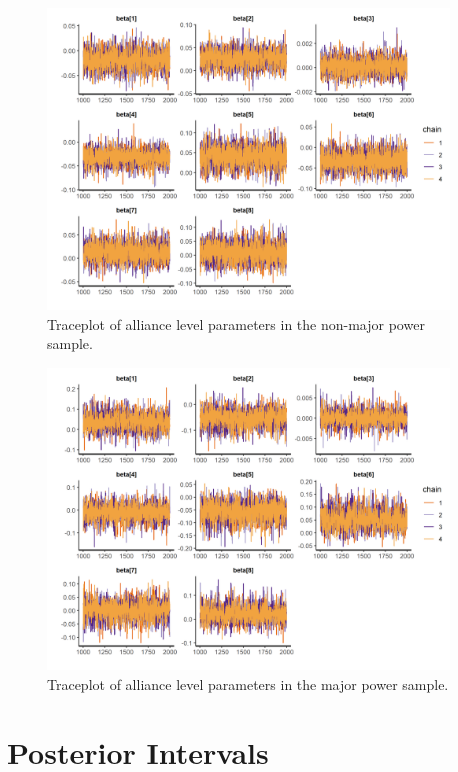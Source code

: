\documentclass[12pt]{article}
\begin{document}
\begin{figure}[htbp]
	\centering
		\includegraphics[width=0.95\textwidth]{trace-all-min.png}
	\caption{Traceplot of alliance level parameters in the non-major power sample.}
	\label{fig:trace-all-min}
\end{figure}


\begin{figure}[htbp]
	\centering
		\includegraphics[width=0.95\textwidth]{trace-all-maj.png}
	\caption{Traceplot of alliance level parameters in the major power sample.}
	\label{fig:trace-all-maj}
\end{figure}




\section{Posterior Intervals} 
\end{document}
